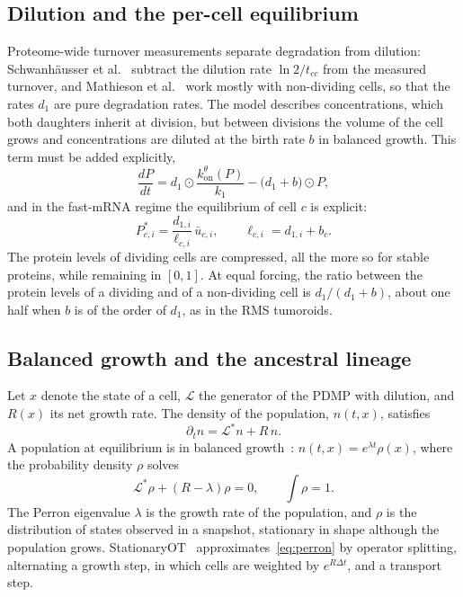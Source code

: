 \documentclass[a4paper, 11pt]{article}
\newcommand{\kon}{k_{\mathrm{on}}^{\theta}}
\theoremstyle{plain}
\theoremstyle{remark}
\begin{document}
\subsection{Dilution and the per-cell equilibrium}\label{sec:dilution}

Proteome-wide turnover measurements separate degradation from dilution: Schwanhäusser et al.~\cite{schwanhausser2011global} subtract the dilution rate $\ln 2/t_{cc}$ from the measured turnover, and Mathieson et al.~\cite{mathieson2018turnover} work mostly with non-dividing cells, so that the rates $d_1$ are pure degradation rates. The model describes concentrations, which both daughters inherit at division, but between divisions the volume of the cell grows and concentrations are diluted at the birth rate $b$ in balanced growth. This term must be added explicitly,
\begin{equation}\label{eq:ode_dil}
\frac{dP}{dt} = d_1 \odot \frac{\kon(P)}{k_1} - \bigl(d_1 + b\bigr) \odot P ,
\end{equation}
and in the fast-mRNA regime the equilibrium of cell $c$ is explicit:
\begin{equation}\label{eq:Pstar}
P^\ast_{c,i} = \frac{d_{1,i}}{\ell_{c,i}}\,\bar u_{c,i}, \qquad \ell_{c,i} = d_{1,i} + b_c .
\end{equation}
The protein levels of dividing cells are compressed, all the more so for stable proteins, while remaining in $[0,1]$. At equal forcing, the ratio between the protein levels of a dividing and of a non-dividing cell is $d_1/(d_1 + b)$, about one half when $b$ is of the order of $d_1$, as in the RMS tumoroids.

\subsection{Balanced growth and the ancestral lineage}\label{sec:balanced}

Let $x$ denote the state of a cell, $\mathcal{L}$ the generator of the PDMP with dilution, and $R(x)$ its net growth rate. The density of the population, $n(t,x)$, satisfies
\begin{equation}\label{eq:pop}
\partial_t n = \mathcal{L}^{*} n + R\, n .
\end{equation}
A population at equilibrium is in balanced growth~\cite{perthame2007transport}: $n(t,x) = e^{\lambda t}\rho(x)$, where the probability density $\rho$ solves
\begin{equation}\label{eq:perron}
\mathcal{L}^{*}\rho + (R - \lambda)\rho = 0, \qquad \int \rho = 1 .
\end{equation}
The Perron eigenvalue $\lambda$ is the growth rate of the population, and $\rho$ is the distribution of states observed in a snapshot, stationary in shape although the population grows. StationaryOT~\cite{zhang2021stationaryot} approximates~\eqref{eq:perron} by operator splitting, alternating a growth step, in which cells are weighted by $e^{R\Delta t}$, and a transport step.
\end{document}
